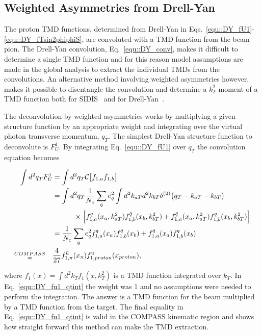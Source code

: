 \subsection{Weighted Asymmetries from Drell-Yan}

The proton TMD functions, determined from Drell-Yan in
Eqs.~\ref{equ::DY_fU1}-\ref{equ::DY_fTsin2phiphiS}, are convoluted with a TMD
function from the beam pion.  The Drell-Yan convolution, Eq.~\ref{equ::DY_conv},
makes it difficult to determine a single TMD function and for this reason model
assumptions are made in the global analysis to extract the individual TMDs from
the convolutions.  An alternative method involving weighted asymmetries however,
makes it possible to disentangle the convolution and determine a $k_T^2$ moment
of a TMD function both for
SIDIS~\cite{Kotzinian:1995cz,Kotzinian:1997wt,Boer:1997nt} and for
Drell-Yan~\cite{Efremov:2004tp,Sissakian:2005vd,Sissakian:2005yp,Wang:2017onm}.

The deconvolution by weighted asymmetries works by multiplying a given structure
function by an appropriate weight and integrating over the virtual photon
transverse momentum, $q_T$.  The simplest Drell-Yan structure function to
deconvolute is $F_U^1$.  By integrating Eq.~\ref{equ::DY_fU1} over $q_T$ the
convolution equation becomes

\begin{align}
  \label{equ::DY_fu1_qtint}
  \int d^2{q_T} F_U^1 &=
  \int d^2{q_T} {\cal C}  \big[ f_{1,a} \bar{f}_{1,b} \big]
  \\ \nonumber
  &= \int d^2{q_T} \frac{1}{N_c} \sum_q e_q^2 \int d^2 k_{aT} d^2 k_{bT} 
  \delta^{(2)}\bigl(q_T - k_{aT} - k_{bT} \bigr)
  \\ \nonumber
  & \quad\quad\quad
  \times \Big[ f_{1,a}^q(x_a,k_{aT}^2)f_{1,b}^{\bar{q}}(x_b,k_{bT}^2) +
    f_{1,a}^{\bar{q}}(x_a,k_{aT}^2)f_{1,b}^{q}(x_b,k_{bT}^2) \Big]
  \\ \nonumber
  &= \frac{1}{N_c} \sum_q
  e_q^2 f_{1,a}^q(x_a)f_{1,b}^{\bar{q}}(x_b) +
  f_{1,a}^{\bar{q}}(x_a)f_{1,b}^{q}(x_b)
  \\ \nonumber
   \substack{COMPASS \\ \approx} \quad &
   \frac{4}{27}f_{1,\pi}^{\bar{u}}(x_\pi)f_{1,proton}^u(x_{proton}),
\end{align}

\noindent
where $f_1(x) = \int d^2 k_{T} f_1(x,k_{T}^2)$ is a TMD function integrated over
$k_T$.  In Eq.~\ref{equ::DY_fu1_qtint} the weight was 1 and no assumptions were
needed to perform the integration.  The answer is a TMD function for the beam
multiplied by a TMD function from the target.  The final equality in
Eq.~\ref{equ::DY_fu1_qtint} is valid in the COMPASS kinematic region and shows
how straight forward this method can make the TMD extraction.


